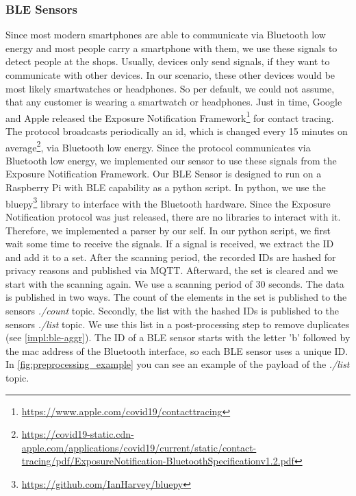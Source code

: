 \documentclass[runningheads]{llncs}
\newcommand{\topicname}[1]{\textit{#1}}
\begin{document}
\subsubsection{BLE Sensors}
\label{impl:ble-sensor}
Since most modern smartphones are able to communicate via Bluetooth low energy and most people carry a smartphone with them, we use these signals to detect people at the shops. Usually, devices only send signals, if they want to communicate with other devices. 
In our scenario, these other devices would be most likely smartwatches or headphones. So per default, we could not assume, that any customer is wearing a smartwatch or headphones.
Just in time, Google and Apple released the Exposure Notification Framework\footnote{\url{https://www.apple.com/covid19/contacttracing}} for contact tracing. The protocol broadcasts periodically an id, which is changed every 15 minutes on average\footnote{\url{https://covid19-static.cdn-apple.com/applications/covid19/current/static/contact-tracing/pdf/ExposureNotification-BluetoothSpecificationv1.2.pdf}}, via Bluetooth low energy. Since the protocol communicates via Bluetooth low energy, we implemented our sensor to use these signals from the Exposure Notification Framework.
Our BLE Sensor is designed to run on a Raspberry Pi with BLE capability as a python script. In python, we use the bluepy\footnote{\url{https://github.com/IanHarvey/bluepy}} library to interface with the Bluetooth hardware. Since the Exposure Notification protocol was just released, there are no libraries to interact with it. Therefore, we implemented a parser by our self.
In our python script, we first wait some time to receive the signals. If a signal is received, we extract the ID and add it to a set. After the scanning period, the recorded IDs are hashed for privacy reasons and published via MQTT. Afterward, the set is cleared and we start with the scanning again. We use a scanning period of 30 seconds.
The data is published in two ways. The count of the elements in the set is published to the sensors \topicname{./count} topic.
Secondly, the list with the hashed IDs is published to the sensors \topicname{./list} topic. We use this list in a post-processing step to remove duplicates (see \cref{impl:ble-aggr}).
The ID of a BLE sensor starts with the letter 'b' followed by the mac address of the Bluetooth interface, so each BLE sensor uses a unique ID.
In \cref{fig:preprocessing_example} you can see an example of the payload of the \topicname{./list} topic.
\end{document}
